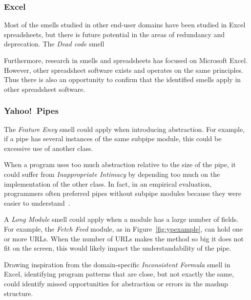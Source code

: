 \documentclass{sig-alternate}
\newcommand{\todo}[1]{\textbf{TODO: #1}}
\begin{document}
\subsubsection{Excel}
Most of the smells studied in other end-user domains have been studied in Excel spreadsheets, but there is future potential in the areas of redundancy and deprecation. The \emph{Dead code} smell

Furthermore, research in smells and spreadsheets has focused on Microsoft Excel. However, other spreadsheet software exists and operates on the same principles. Thus there is also an opportunity to confirm that the identified smells apply in other spreadsheet software.

\subsubsection{Yahoo!\ Pipes}
\label{sec:smells:future:yp}
The \emph{Feature Envy} smell could  apply when introducing abstraction. For example, if a pipe has several instances of the same subpipe module, this could be excessive use of another class. 

When a program uses too much abstraction relative to the size of the pipe, it could suffer from \emph{Inappropriate Intimacy} by depending too much on the implementation of the other class. In fact, in an empirical evaluation, programmers often preferred pipes without subpipe modules because they were easier to understand~\cite{StoleeTSE2013}. 

A \emph{Long Module} smell could apply when a module has a large number of fields. For example, the \emph{Fetch Feed} module, as in Figure~\ref{fig:ypexample}, can hold one or more URLs. When the number of URLs makes the method so big it does not fit on the screen, this would likely impact the understandability of the pipe. 

Drawing inspiration from the domain-specific \emph{Inconsistent Formula} smell in Excel, identifying program patterns that are close, but not exactly the same, could identify missed opportunities for abstraction or errors in the mashup structure. 


\end{document}
